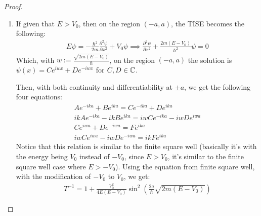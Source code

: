 \documentclass{article}
\begin{document}
\begin{proof}
\begin{enumerate}
        \hfil

        \item If given that $E>V_0$, then on the region $(-a,a)$, the TISE becomes the following:
        \begin{align}
            E\psi=-\frac{\hbar^2}{2m}\frac{\partial^2\psi}{\partial x^2}+V_0\psi\implies \frac{\partial^2\psi}{\partial x^2}+\frac{2m(E-V_0)}{\hbar^2}\psi=0
        \end{align}
        Which, with $w:=\frac{\sqrt{2m(E-V_0)}}{\hbar}$, on the region $(-a,a)$ the solution is $\psi(x)=Ce^{iwx}+De^{-iwx}$ for $C,D\in\mathbb{C}$.

        Then, with both continuity and differentiability at $\pm a$, we get the following four equations:
        \begin{align}
            Ae^{-ika}+Be^{ika}=Ce^{-ika}+De^{ika}\\
            ikAe^{-ika}-ikBe^{ika}=iwCe^{-ika}-iwDe^{iwa}\\
            Ce^{iwa}+De^{-iwa}=Fe^{ika}\\
            iwCe^{iwa}-iwDe^{-iwa}=ikFe^{ika}
        \end{align}
        Notice that this relation is similar to the finite square well (basically it's with the energy being $V_0$ instead of $-V_0$, since $E>V_0$, it's similar to the finite square well case where $E>-V_0$). Using the equation from finite square well, with the modification of $-V_0$ to $V_0$, we get:
        \begin{align}
            T^{-1} = 1+\frac{V_0^2}{4E(E-V_0)}\sin^2\left(\frac{2a}{\hbar}\sqrt{2m(E-V_0)}\right)
        \end{align}
    \end{enumerate}
\end{proof}

\newpage
\end{document}

